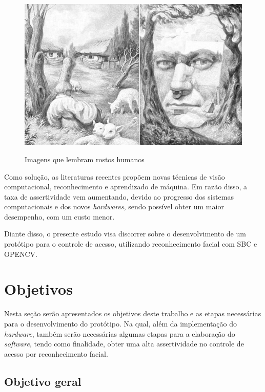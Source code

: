 \begin{figure}[h!]
    \centering
    \caption{Imagens que lembram rostos humanos}
    \includegraphics[scale=0.25]{figuras/pareidolia.jpg} 
    \label{fig:pareidolia}
    \centering
\end{figure}

Como solução, as literaturas recentes propõem novas técnicas de visão computacional, 
reconhecimento e aprendizado de máquina. Em razão disso, a taxa de assertividade 
vem aumentando, devido ao progresso dos sistemas computacionais e dos 
novos \textit{hardwares}, sendo possível obter um maior desempenho, com um custo
menor.

Diante disso, o presente estudo visa discorrer sobre o desenvolvimento de um protótipo 
para o controle de acesso, utilizando reconhecimento facial com SBC e OPENCV.

\section{Objetivos}\label{sec:objetivos}

Nesta seção serão apresentados os objetivos deste trabalho e as etapas necessárias 
para o desenvolvimento do protótipo. Na qual, além da implementação do 
\textit{hardware}, também serão necessárias algumas etapas para a elaboração do \textit{software}, 
tendo como finalidade, obter uma alta assertividade no controle de acesso por 
reconhecimento facial.

\subsection{Objetivo geral}\label{subsec:objetivoGeral}

